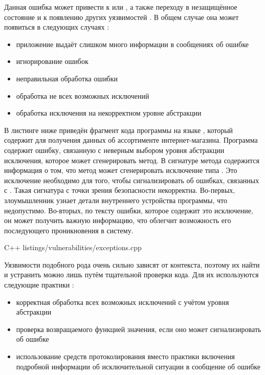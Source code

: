 %
Данная ошибка может привести к  или , а также переходу в незащищённое состояние и к появлению других уязвимостей  . 
%
В общем случае она может появиться в следующих случаях :
\begin{itemize}
	\item приложение выдаёт слишком много информации в сообщениях об ошибке 
	\item игнорирование ошибок 
	\item неправильная обработка ошибки 
	\item обработка не всех возможных исключений 
	\item обработка исключения на некорректном уровне абстракции 
\end{itemize}

%
В листинге ниже приведён фрагмент кода программы на языке , который содержит  для получения данных об ассортименте интернет-магазина. 
%
Программа содержит ошибку, связанную с неверным выбором уровня абстракции исключения, которое может сгенерировать метод. 
%
В сигнатуре метода  содержится информация о том, что метод может сгенерировать исключение типа . 
%
Это исключение необходимо для того, чтобы сигнализировать об ошибках, связанных с . 
%
Такая сигнатура с точки зрения безопасности некорректна. 
%
Во-первых, злоумышленник узнает детали внутреннего устройства программы, что недопустимо. 
%
Во-вторых, по тексту ошибки, которое содержит это исключение, он может получить важную информацию, что облегчит возможность его последующего проникновения в систему. 

	{C++}
	{listings/vulnerabilities/exceptions.cpp}

%
Уязвимости подобного рода очень сильно зависят от контекста, поэтому их найти и устранить можно лишь путём тщательной проверки кода. 
%
Для их  используются следующие практики : 
\begin{itemize}
	
	\item корректная обработка всех возможных исключений с учётом уровня абстракции 
	
	\item проверка возвращаемого функцией значения, если оно может сигнализировать об ошибке 
	
	\item использование средств протоколирования вместо практики включения подробной информации об исключительной ситуации в сообщение об ошибке 
\end{itemize}

